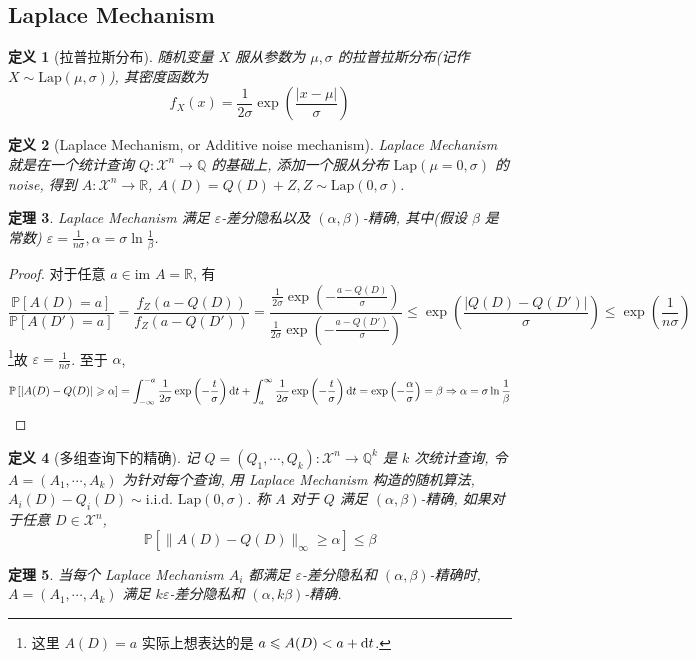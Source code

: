 \documentclass[8pt]{article}
\theoremstyle{compact}
\newtheorem{theorem}{定理}[section]
\newtheorem{definition}[theorem]{定义}
\def\le{\leqslant}
\def\ge{\geqslant}
\def\im{\text{im }}
\def\P#1{\mathbb{P}\left[{#1}\right]}
\begin{document}
\subsection{Laplace Mechanism}
\begin{definition}[拉普拉斯分布]
	随机变量 $X$ 服从参数为 $\mu, \sigma$ 的拉普拉斯分布(记作 $X \sim \text{Lap}(\mu, \sigma)$), 其密度函数为 $$f_X(x) = \frac{1}{2\sigma}\exp\left(\frac{|x-\mu|}{\sigma}\right)$$
\end{definition}
\begin{definition}[Laplace Mechanism, or Additive noise mechanism]
	Laplace Mechanism 就是在一个统计查询 $Q: \mathcal X^n \to \mathbb Q$ 的基础上, 添加一个服从分布 $\text{Lap}(\mu = 0, \sigma)$ 的noise, 得到 $A: \mathcal X^n \to \mathbb R$, $A(D) = Q(D) + Z, Z \sim \text{Lap}(0, \sigma)$.
\end{definition}
\begin{theorem}
	Laplace Mechanism 满足 $\varepsilon$-差分隐私以及 $(\alpha, \beta)$-精确, 其中(假设 $\beta$ 是常数) $\varepsilon = \frac{1}{n\sigma}, \alpha = \sigma \ln \frac{1}{\beta}$.
\end{theorem}
\begin{proof}
	对于任意 $a \in \im A = \mathbb R$, 有 $$\frac{\P{A(D) = a}}{\P{A(D') = a}} = \frac{f_Z(a - Q(D))}{f_Z(a - Q(D'))} = \frac{\frac{1}{2\sigma}\exp\left(-\frac{a-Q(D)}{\sigma}\right)}{\frac{1}{2\sigma}\exp\left(-\frac{a-Q(D')}{\sigma}\right)} \le \exp\left(\frac{|Q(D) - Q(D')|}{\sigma}\right) \le \exp\left(\frac{1}{n\sigma}\right)$$ \footnote{这里 $A(D) = a$ 实际上想表达的是 $a \le A(D) < a + \text dt$.}故 $\varepsilon = \frac{1}{n \sigma}$. 至于 $\alpha$, 
	$$\P{|A(D) - Q(D)| \ge \alpha} = \int_{-\infty}^{-a}\frac{1}{2\sigma}\exp\left(-\frac t{\sigma}\right)\text dt + \int_a^{\infty}\frac{1}{2\sigma}\exp\left(-\frac t{\sigma}\right)\text dt = \exp\left(-\frac{\alpha}{\sigma}\right) = \beta \Rightarrow \alpha = \sigma \ln \frac{1}{\beta}$$
\end{proof}
\begin{definition}[多组查询下的精确]
	记 $Q = (Q_1, \cdots, Q_k): \mathcal X^n \to \mathbb Q^k$ 是 $k$ 次统计查询, 令 $A = (A_1, \cdots, A_k)$ 为针对每个查询, 用 Laplace Mechanism 构造的随机算法, $A_i(D) - Q_i(D) \sim \text{i.i.d. } \text{Lap}(0, \sigma)$. 称 $A$ 对于 $Q$ 满足 $(\alpha, \beta)$-精确, 如果对于任意 $D \in \mathcal X^n$, $$\P{\|A(D) - Q(D)\|_{\infty} \ge \alpha} \le \beta$$
\end{definition}
\begin{theorem}
	当每个 Laplace Mechanism $A_i$ 都满足 $\varepsilon$-差分隐私和 $(\alpha, \beta)$-精确时, $A = (A_1, \cdots, A_k)$ 满足 $k\varepsilon$-差分隐私和 $(\alpha, k\beta)$-精确.
\end{theorem}
\end{document}
